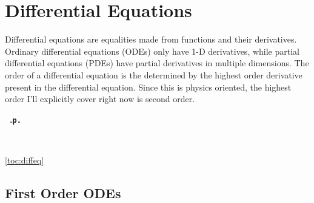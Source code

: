 \section{Differential Equations} 
\invisiblelocaltableofcontents\label{toc:diffeq}
Differential equations are equalities made from functions and their derivatives. Ordinary differential equations (ODEs) only have 1-D derivatives, while partial differential equations (PDEs) have partial derivatives in multiple dimensions. The order of a differential equation is the determined by the highest order derivative present in the differential equation. Since this is physics oriented, the highest order I'll explicitly cover right now is second order. 
\par
\begingroup
    \parindent 0cm \parfillskip 0cm \leftskip 0cm \rightskip 0cm
                  {}
                  {\leavevmode\leftskip 0cm\relax} {\normalsize\bf\etocnumber~\rm\etocname\nobreak\leaders\hbox{.}\hfill\tt p.\makebox[12 pt][r]{\etocpage} \par}
                  {\vspace{-0.25cm}}
                  {}
                  {\leavevmode\leftskip 1cm\relax}
                  {\small\bf\etocnumber~\rm\etocname\par}
                  {}
    \tableofcontents\ref{toc:diffeq}
\endgroup\newpage
\subsection{First Order ODEs}
